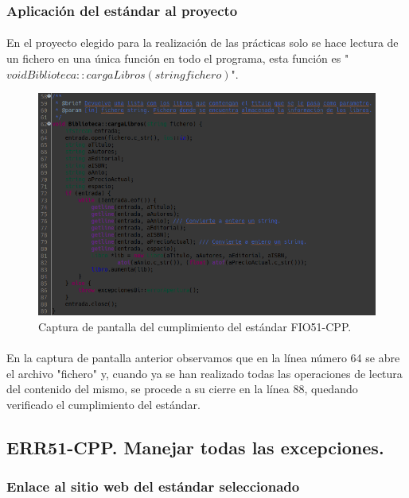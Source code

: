 		\subsubsection{Aplicación del estándar al proyecto}
	
			\paragraph{}En el proyecto elegido para la realización de las prácticas solo se hace lectura de un fichero en una única función en todo el programa, esta función es "$void Biblioteca::cargaLibros(string fichero)$".
	
			\begin{figure}[H]
				\centering
				\includegraphics[scale=0.55]{img/captura1.png}
				\caption{Captura de pantalla del cumplimiento del estándar FIO51-CPP.}
				\label{captura1}
			\end{figure}
	
			\paragraph{}En la captura de pantalla anterior observamos que en la línea número 64 se abre el archivo "fichero" y, cuando ya se han realizado todas las operaciones de lectura del contenido del mismo, se procede a su cierre en la línea 88, quedando verificado el cumplimiento del estándar.
			
	\subsection{ERR51-CPP. Manejar todas las excepciones.}
	
		\subsubsection{Enlace al sitio web del estándar seleccionado}
			

